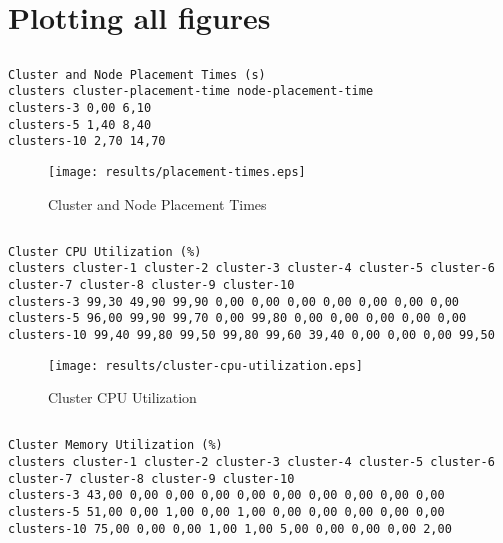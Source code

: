 \documentclass{elsart}
\begin{document}
\section{Plotting all figures}
\subsection{}

\begin{lstlisting}[caption={Cluster and Node Placement Times}]
Cluster and Node Placement Times (s)
clusters cluster-placement-time node-placement-time
clusters-3 0,00 6,10
clusters-5 1,40 8,40
clusters-10 2,70 14,70
\end{lstlisting}

\begin{figure}[ht]
\centering
\texttt{[image: results/placement-times.eps]}
\caption{Cluster and Node Placement Times}\label{fig:placement-times.eps}
\end{figure}

\subsection{}

\begin{lstlisting}[caption={Cluster CPU Utilization}]
Cluster CPU Utilization (%)
clusters cluster-1 cluster-2 cluster-3 cluster-4 cluster-5 cluster-6 cluster-7 cluster-8 cluster-9 cluster-10
clusters-3 99,30 49,90 99,90 0,00 0,00 0,00 0,00 0,00 0,00 0,00
clusters-5 96,00 99,90 99,70 0,00 99,80 0,00 0,00 0,00 0,00 0,00
clusters-10 99,40 99,80 99,50 99,80 99,60 39,40 0,00 0,00 0,00 99,50
\end{lstlisting}

\begin{figure}[ht]
\centering
\texttt{[image: results/cluster-cpu-utilization.eps]}
\caption{Cluster CPU Utilization}\label{fig:cluster-cpu-utilization.eps}
\end{figure}

\subsection{}

\begin{lstlisting}[caption={Cluster Memory Utilization}]
Cluster Memory Utilization (%)
clusters cluster-1 cluster-2 cluster-3 cluster-4 cluster-5 cluster-6 cluster-7 cluster-8 cluster-9 cluster-10
clusters-3 43,00 0,00 0,00 0,00 0,00 0,00 0,00 0,00 0,00 0,00
clusters-5 51,00 0,00 1,00 0,00 1,00 0,00 0,00 0,00 0,00 0,00
clusters-10 75,00 0,00 0,00 1,00 1,00 5,00 0,00 0,00 0,00 2,00
\end{lstlisting}
\end{document}
